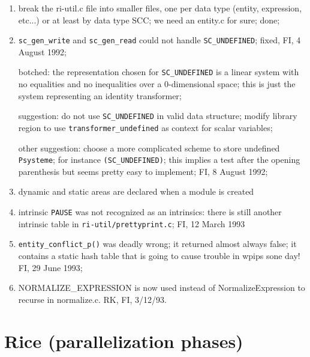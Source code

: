 \begin{enumerate}

  \item break the ri-util.c file into smaller files, one per data type
        (entity, expression, etc...) or at least by data type SCC; we
        need an entity.c for sure; done;

  \item \verb+sc_gen_write+ and \verb+sc_gen_read+ could not handle
        \verb+SC_UNDEFINED+; fixed, FI, 4 August 1992;

        botched: the representation chosen for {\tt SC\_UNDEFINED} is a
        linear system with no equalities and no inequalities over a
        0-dimensional space; this is just the system representing an
        identity transformer;

        suggestion: do not use {\tt SC\_UNDEFINED} in valid data structure;
        modify library region to use \verb+transformer_undefined+ as context
        for scalar variables;

        other suggestion: choose a more complicated scheme to store
        undefined \verb+Psysteme+; for instance \verb+(SC_UNDEFINED)+;
        this implies a test after the opening parenthesis but seems
        pretty easy to implement; FI, 8 August 1992;

  \item dynamic and static areas are declared when a module is created

  \item intrinsic \verb+PAUSE+ was not recognized as an intrinsics:
        there is still another intrinsic table in
        \verb+ri-util/prettyprint.c+;
        FI, 12 March 1993

  \item \verb+entity_conflict_p()+ was deadly wrong; it returned almost
        always false; it contains a static hash table that is going to
        cause trouble in wpips sone day! FI, 29 June 1993;


  \item NORMALIZE\_EXPRESSION is now used instead of
        NormalizeExpression to recurse in normalize.c. RK, FI, 3/12/93.


\end{enumerate}

\section{Rice (parallelization phases)}

